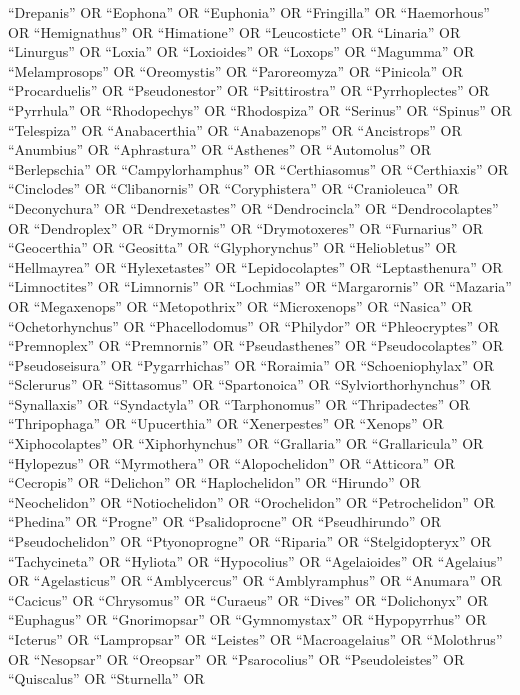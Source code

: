 \documentclass[
  number,
  review,
  onecolumn]{elsarticle}
\begin{document}
``Drepanis'' OR ``Eophona'' OR ``Euphonia'' OR ``Fringilla'' OR
``Haemorhous'' OR ``Hemignathus'' OR ``Himatione'' OR ``Leucosticte'' OR
``Linaria'' OR ``Linurgus'' OR ``Loxia'' OR ``Loxioides'' OR ``Loxops''
OR ``Magumma'' OR ``Melamprosops'' OR ``Oreomystis'' OR ``Paroreomyza''
OR ``Pinicola'' OR ``Procarduelis'' OR ``Pseudonestor'' OR
``Psittirostra'' OR ``Pyrrhoplectes'' OR ``Pyrrhula'' OR ``Rhodopechys''
OR ``Rhodospiza'' OR ``Serinus'' OR ``Spinus'' OR ``Telespiza'' OR
``Anabacerthia'' OR ``Anabazenops'' OR ``Ancistrops'' OR ``Anumbius'' OR
``Aphrastura'' OR ``Asthenes'' OR ``Automolus'' OR ``Berlepschia'' OR
``Campylorhamphus'' OR ``Certhiasomus'' OR ``Certhiaxis'' OR
``Cinclodes'' OR ``Clibanornis'' OR ``Coryphistera'' OR ``Cranioleuca''
OR ``Deconychura'' OR ``Dendrexetastes'' OR ``Dendrocincla'' OR
``Dendrocolaptes'' OR ``Dendroplex'' OR ``Drymornis'' OR
``Drymotoxeres'' OR ``Furnarius'' OR ``Geocerthia'' OR ``Geositta'' OR
``Glyphorynchus'' OR ``Heliobletus'' OR ``Hellmayrea'' OR
``Hylexetastes'' OR ``Lepidocolaptes'' OR ``Leptasthenura'' OR
``Limnoctites'' OR ``Limnornis'' OR ``Lochmias'' OR ``Margarornis'' OR
``Mazaria'' OR ``Megaxenops'' OR ``Metopothrix'' OR ``Microxenops'' OR
``Nasica'' OR ``Ochetorhynchus'' OR ``Phacellodomus'' OR ``Philydor'' OR
``Phleocryptes'' OR ``Premnoplex'' OR ``Premnornis'' OR
``Pseudasthenes'' OR ``Pseudocolaptes'' OR ``Pseudoseisura'' OR
``Pygarrhichas'' OR ``Roraimia'' OR ``Schoeniophylax'' OR ``Sclerurus''
OR ``Sittasomus'' OR ``Spartonoica'' OR ``Sylviorthorhynchus'' OR
``Synallaxis'' OR ``Syndactyla'' OR ``Tarphonomus'' OR ``Thripadectes''
OR ``Thripophaga'' OR ``Upucerthia'' OR ``Xenerpestes'' OR ``Xenops'' OR
``Xiphocolaptes'' OR ``Xiphorhynchus'' OR ``Grallaria'' OR
``Grallaricula'' OR ``Hylopezus'' OR ``Myrmothera'' OR ``Alopochelidon''
OR ``Atticora'' OR ``Cecropis'' OR ``Delichon'' OR ``Haplochelidon'' OR
``Hirundo'' OR ``Neochelidon'' OR ``Notiochelidon'' OR ``Orochelidon''
OR ``Petrochelidon'' OR ``Phedina'' OR ``Progne'' OR ``Psalidoprocne''
OR ``Pseudhirundo'' OR ``Pseudochelidon'' OR ``Ptyonoprogne'' OR
``Riparia'' OR ``Stelgidopteryx'' OR ``Tachycineta'' OR ``Hyliota'' OR
``Hypocolius'' OR ``Agelaioides'' OR ``Agelaius'' OR ``Agelasticus'' OR
``Amblycercus'' OR ``Amblyramphus'' OR ``Anumara'' OR ``Cacicus'' OR
``Chrysomus'' OR ``Curaeus'' OR ``Dives'' OR ``Dolichonyx'' OR
``Euphagus'' OR ``Gnorimopsar'' OR ``Gymnomystax'' OR ``Hypopyrrhus'' OR
``Icterus'' OR ``Lampropsar'' OR ``Leistes'' OR ``Macroagelaius'' OR
``Molothrus'' OR ``Nesopsar'' OR ``Oreopsar'' OR ``Psarocolius'' OR
``Pseudoleistes'' OR ``Quiscalus'' OR ``Sturnella'' OR
\end{document}
